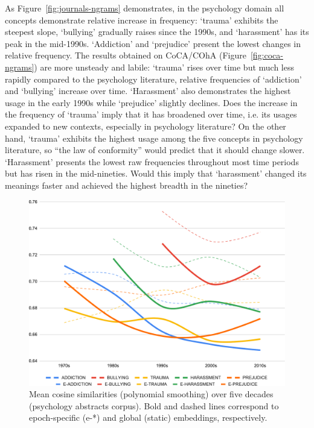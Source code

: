 \documentclass[output=paper]{langsci/langscibook}
\begin{document}
As Figure~\ref{fig:journals-ngrams} demonstrates, in the psychology domain all concepts demonstrate relative increase in frequency: `trauma' exhibits the steepest slope, `bullying' gradually raises since the 1990s, and `harassment' has its peak in the mid-1990s. `Addiction' and `prejudice' present the lowest changes in relative fre\-quen\-cy. The results obtained on CoCA/COhA (Figure~\ref{fig:coca-ngrams}) are more unsteady and labile: `trauma' rises over time but much less rapidly compared to the psychology literature, relative frequencies of `addiction' and `bullying' increase over time. `Harassment' also demonstrates the highest usage in the early 1990s while `prejudice' slightly declines.
Does the increase in the frequency of `trauma' imply that it has broadened over time, i.e. its usages expanded to new contexts, especially in psychology literature?  On the other hand, `trauma' exhibits the highest usage among the five concepts in psychology literature, so ``the law of conformity'' \citep{hamilton-etal-2016-diachronic} would
predict that it should change slower. `Harassment' presents the lowest raw frequencies throughout most time periods but has risen in the mid-nineties. Would this imply that `harassment' changed its meanings faster and achieved the highest breadth in the nineties? 

\begin{figure}[p]
  \includegraphics[width=.8\textwidth]{figures/VYLOMOVA_context-sim-psychol.pdf}
\caption{Mean cosine similarities (polynomial smoothing) over five decades (psychology abstracts corpus). Bold and dashed lines correspond to epoch-specific (e-*) and global (static) embeddings, respectively. \label{fig:avg-cos-sim-psych}}
\end{figure}
\end{document}
